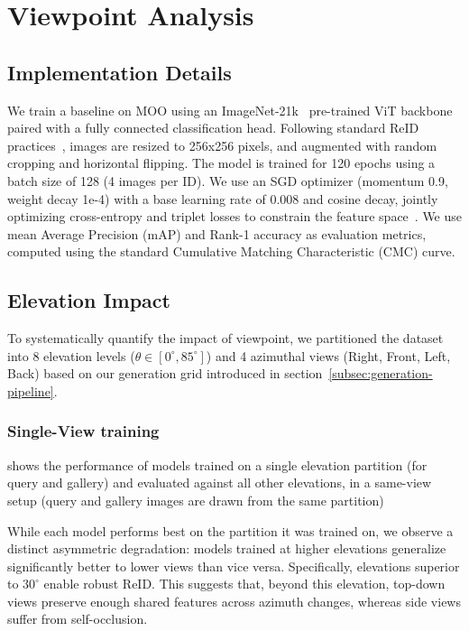\section{Viewpoint Analysis}
\label{sec:viewpoint_analysis}

\subsection{Implementation Details}
\label{subsec:implementation-details}

We train a baseline on MOO using an ImageNet-21k~\cite{ridnikImageNet21KPretrainingMasses2021a} pre-trained ViT backbone~\cite{dosovitskiyImageWorth16x162020a} paired with a fully connected classification head.
Following standard ReID practices~\cite{9025455}, images are resized to 256x256 pixels, and augmented with random cropping and horizontal flipping.
The model is trained for 120 epochs using a batch size of 128 (4 images per ID).
We use an SGD optimizer (momentum 0.9, weight decay 1e-4) with a base learning rate of 0.008 and cosine decay, jointly optimizing cross-entropy and triplet losses to constrain the feature space~\cite{9025455}.
We use mean Average Precision (mAP) and Rank-1 accuracy as evaluation metrics, computed using the standard Cumulative Matching Characteristic (CMC) curve.

\subsection{Elevation Impact}
\label{subsec:elevation_impact}

To systematically quantify the impact of viewpoint, we partitioned the dataset into 8 elevation levels ($\theta \in [0^\circ, 85^\circ]$) and 4 azimuthal views (Right, Front, Left, Back) based on our generation grid introduced in section~\ref{subsec:generation-pipeline}.

\subsubsection*{Single-View training}

 shows the performance of models trained on a single elevation partition (for query and gallery) and evaluated against all other elevations, in a same-view setup (\ie query and gallery images are drawn from the same partition)

While each model performs best on the partition it was trained on, we observe a distinct asymmetric degradation: models trained at higher elevations generalize significantly better to lower views than vice versa.
Specifically, elevations superior to $30^\circ$ enable robust ReID.
This suggests that, beyond this elevation, top-down views preserve enough shared features across azimuth changes, whereas side views suffer from self-occlusion.

